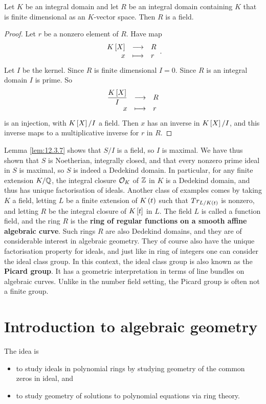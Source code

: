 \begin{lemma}
\label{lem:12.3.7}
Let $ K $ be an integral domain and let $ R $ be an integral domain containing $ K $ that is finite dimensional as an $ K $-vector space. Then $ R $ is a field.
\end{lemma}

\begin{proof}
Let $ r $ be a nonzero element of $ R $. Have map
$$ \function{K\sbr{X}}{R}{x}{r}. $$
Let $ I $ be the kernel. Since $ R $ is finite dimensional $ I = 0 $. Since $ R $ is an integral domain $ I $ is prime. So
$$ \function{\dfrac{K\sbr{X}}{I}}{R}{x}{r} $$
is an injection, with $ K\sbr{X} / I $ a field. Then $ x $ has an inverse in $ K\sbr{X} / I $, and this inverse maps to a multiplicative inverse for $ r $ in $ R $.
\end{proof}

Lemma \ref{lem:12.3.7} shows that $ S / I $ is a field, so $ I $ is maximal. We have thus shown that $ S $ is Noetherian, integrally closed, and that every nonzero prime ideal in $ S $ is maximal, so $ S $ is indeed a Dedekind domain. In particular, for any finite extension $ K / \mathbb{Q} $, the integral closure $ \mathcal{O}_K $ of $ \mathbb{Z} $ in $ K $ is a Dedekind domain, and thus has unique factorisation of ideals. Another class of examples comes by taking $ K $ a field, letting $ L $ be a finite extension of $ K\br{t} $ such that $ Tr_{L / K\br{t}} $ is nonzero, and letting $ R $ be the integral closure of $ K\sbr{t} $ in $ L $. The field $ L $ is called a function field, and the ring $ R $ is the \textbf{ring of regular functions on a smooth affine algebraic curve}. Such rings $ R $ are also Dedekind domains, and they are of considerable interest in algebraic geometry. They of course also have the unique factorisation property for ideals, and just like in ring of integers one can consider the ideal class group. In this context, the ideal class group is also known as the \textbf{Picard group}. It has a geometric interpretation in terms of line bundles on algebraic curves. Unlike in the number field setting, the Picard group is often not a finite group.

\pagebreak

\section{Introduction to algebraic geometry}


The idea is
\begin{itemize}
\item to study ideals in polynomial rings by studying geometry of the common zeros in ideal, and
\item to study geometry of solutions to polynomial equations via ring theory.
\end{itemize}

